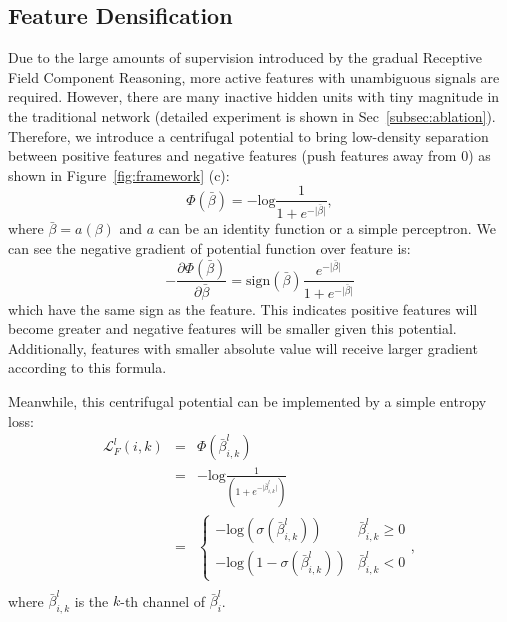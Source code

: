 \documentclass[final]{cvpr}
\begin{document}
\subsection{Feature Densification}
\label{subsec:fd}
Due to the large amounts of supervision introduced by the gradual Receptive Field Component Reasoning, more active features with unambiguous signals are required. However, there are many inactive hidden units with tiny magnitude in the traditional network (detailed experiment is shown in Sec~\ref{subsec:ablation}). Therefore, we introduce a centrifugal potential to bring low-density separation between positive features and negative features (\ie push features away from $0$) as shown in Figure~\ref{fig:framework} (c):
\begin{equation}
    \Phi(\bar{\beta}) = -\text{log}\frac{1}{1+e^{-\vert \bar{\beta} \vert}},
\end{equation}
where $\bar{\beta}=a(\beta)$ and $a$ can be an identity function or a simple perceptron. We can see the negative gradient of potential function over feature is:
\begin{equation}
\label{eq:gradient}
    -\frac{\partial \Phi(\bar{\beta})}{\partial \bar{\beta}} = \text{sign}(\bar{\beta})\frac{e^{-\vert \bar{\beta} \vert}}{1 + e^{-\vert \bar{\beta} \vert}}
\end{equation}
which have the same sign as the feature. This indicates positive features will become greater and negative features will be smaller given this potential. Additionally, features with smaller absolute value will receive larger gradient according to this formula.

Meanwhile, this centrifugal potential can be implemented by a simple entropy loss:
\begin{equation}
\label{eq:fd_feature_loss}
    \begin{array}{rcl}
    \mathcal{L}_F^l(i,k) & = & \Phi(\bar{\beta}_{i,k}^l)\\
    & = & -\text{log}\frac{1}{(1+e^{-\vert \bar{\beta}_{i,k}^l\vert})}\\
    & = & \left\{
    \begin{array}{ll}
    -\text{log}(\sigma(\bar{\beta}_{i,k}^l)) & \bar{\beta}_{i,k}^l \ge 0\\
    -\text{log}(1-\sigma(\bar{\beta}_{i,k}^l)) & \bar{\beta}_{i,k}^l < 0
    \end{array}
    \right. ,\\
    \end{array}
\end{equation}
where $\bar{\beta}_{i,k}^l$ is the $k$-th channel of $\bar{\beta}_i^l$.
\end{document}
